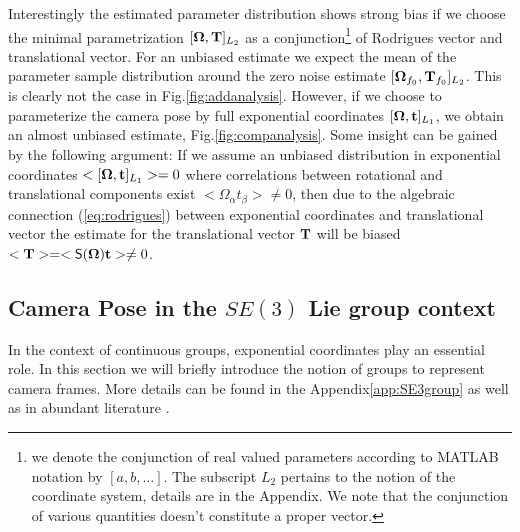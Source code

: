 \documentclass[conference]{IEEEtran}
\newcommand{\bfOmega}{\boldsymbol{\Omega}}
\begin{document}
Interestingly the estimated parameter distribution shows strong bias if we choose the minimal parametrization
$[\bfOmega, {\bf T}]_{L_2}$ as a conjunction\footnote{we denote the conjunction of real valued parameters
according to MATLAB notation by $ [ a, b,\ldots ]$. The subscript $L_2$ pertains to the notion of the coordinate system, details are in the
Appendix.
We note that the conjunction of various quantities doesn't constitute a proper vector.} of Rodrigues vector
and translational vector. For an unbiased estimate we
expect the mean of the parameter sample distribution around the zero noise estimate
$[\bfOmega_{f_0}, {\bf T}_{f_0}]_{L_2}$. This is clearly not the case in Fig.\ref{fig:addanalysis}. However, if we choose
to parameterize the camera pose by full exponential coordinates $[\bfOmega, {\bf t}]_{L_1}$, we obtain an almost unbiased estimate, Fig.\ref{fig:companalysis}.
Some insight can be gained by the following argument: If we assume an unbiased distribution in exponential
coordinates $ < [\bfOmega, {\bf t}]_{L_1} > = 0$ where correlations between
rotational and translational components exist $< \Omega_\alpha t_\beta > \neq 0$,
then due to the algebraic connection (\ref{eq:rodrigues}) between exponential coordinates and translational vector the
estimate for the translational vector ${\bf T}$ will be biased $< {\bf T} > = < {\sf S}(\bfOmega) {\bf t} > \neq 0$.

\subsection{Camera Pose in the $SE(3)$ Lie group context}

In the context of continuous groups, exponential coordinates play an essential role.
In this section we will briefly introduce the notion of groups to represent camera frames. More details can be found in the Appendix\ref{app:SE3group} as well as in abundant literature \cite{liegroups}.
\end{document}
